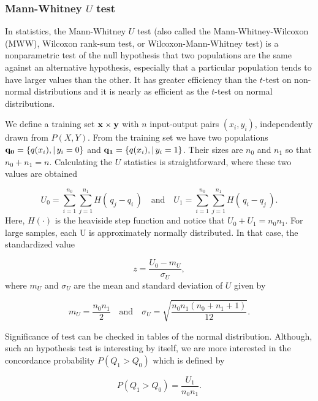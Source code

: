 \subsubsection{Mann-Whitney $U$ test}
\label{sec:U}

In statistics, the Mann-Whitney $U$ test (also called the Mann-Whitney-Wilcoxon (MWW), Wilcoxon rank-sum test, or Wilcoxon-Mann-Whitney test) is a nonparametric test of the null hypothesis that two populations are the same against an alternative hypothesis, especially that a particular population tends to have larger values than the other.  It has greater efficiency than the $t$-test on non-normal distributions and it is nearly as efficient as the $t$-test on normal distributions.

We define a training set $\mathbf{x} \times \mathbf{y}$ with $n$ input-output pairs $(x_i, y_i)$, independently drawn from $P(X,Y)$.  From the training set we have two populations $\mathbf{q_0} = \{q(x_i) , | \, y_i = 0 \}$ and $\mathbf{q_1} = \{q(x_i) , | \, y_i = 1 \}$.  Their sizes are $n_0$ and $n_1$ so that $n_0 + n_1 = n$.  Calculating the $U$ statistics is straightforward, where these two values are obtained 

\begin{equation}
\label{eq:U}
U_0 = \sum_{i=1}^{n_0}\sum_{j=1}^{n_1} H(\,q_j - q_i    \,) \quad \mbox{and} \quad 
U_1 = \sum_{i=1}^{n_0}\sum_{j=1}^{n_1} H( \,q_i - q_j    \,).
\end{equation}
Here, $H(\cdot)$ is the heaviside step function and notice that $U_0 + U_1 = n_0n_1$.  For large samples, each U is approximately normally distributed. In that case, the standardized value

\begin{equation}
\label{eq:z}
z = \frac{U_0 - m_{U}}{\sigma_{U}},
\end{equation}
where $m_U$ and $\sigma_U$ are the mean and standard deviation of $U$ given by

\begin{equation}
\label{eq:z}
m_U = \frac{n_0n_1}{2} \quad \mbox{and} \quad 
\sigma_U = \sqrt{\frac{n_0n_1(n_0 + n_1 + 1)}{12} }.
\end{equation}

Significance of test can be checked in tables of the normal distribution.  Although, such an hypothesis test is interesting by itself, we are more interested in the concordance probability $P(Q_1 > Q_0)$ which is defined by

\begin{equation}
\label{eq:concordance}
P(Q_1 > Q_0) = \frac{U_1}{n_0n_1}.
\end{equation}

